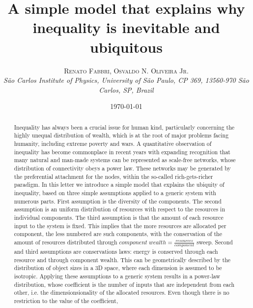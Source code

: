 \documentclass[a4paper, 11pt]{article} %
\title{\textbf{A simple model that explains why inequality is inevitable and ubiquitous}\\ %
} %
\author{\textsc{Renato Fabbri, Osvaldo N. Oliveira Jr.} %
\\{\textit{São Carlos Institute of Physics, University of São Paulo, CP 369, 13560-970 São Carlos, SP, Brazil}}} %
\date{\today} %
\makeatletter
\renewcommand{\maketitle}{ %
\begin{flushright} %
{\LARGE\@title} %

\vspace{5pt} %

{\large\@author} %
\\\@date %

\vspace{1pt} %
\end{flushright}
}
\makeatother
\begin{document}
\maketitle %



%
\begin{abstract}
	Inequality has always been a crucial issue for human kind, particularly concerning the highly unequal distribution of wealth, which is at the root of major problems facing humanity, including extreme poverty and wars.
	A quantitative observation of inequality has become commonplace in recent years
	with expanding recognition that many natural and man-made systems can be represented as scale-free networks,
	whose distribution of connectivity obeys a power law.
	These networks may be generated by the preferential attachment for the nodes, within the so-called rich-gets-richer paradigm.
	In this letter we introduce a simple model that explains the ubiquity of inequality, based on three simple assumptions applied to a generic system with numerous parts.
	First assumption is the diversity of the components.
	The second assumption is an uniform distribution of resources with respect to the resources in individual components.
	The third assumption is that the amount of each resource input to the system is fixed.
	This implies that the more resources are allocated per component, the less numbered are such components,
	with the conservation of the amount of resources distributed through $component\; wealth = \frac{resources}{component}$ sweep.
	Second and third assumptions are conservations laws: energy is conserved through each resource and through component wealth.
	This can be geometrically described by the distribution of object sizes in a 3D space, where each dimension is assumed to be isotropic.
	Applying these assumptions to a generic system results in a power-law distribution, whose coefficient is the number of inputs that are independent from each other, i.e. the dimensionsionality of the allocated resources.
	Even though there is no restriction to the value of the coefficient,

\end{abstract}
\end{document}
